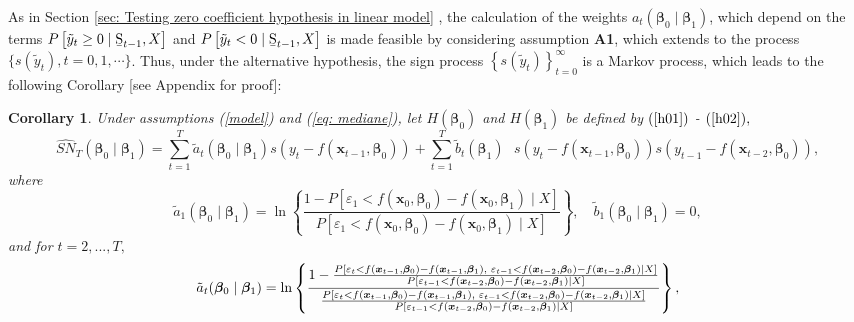 \documentclass[harvard,11pt]{article}
\newtheorem{corollary}{Corollary}
\begin{document}
As in Section \ref{sec: Testing zero coefficient hypothesis in linear model}%
, the calculation of the weights $a_{t}(\bm{\beta}_{0}\mid\bm{\beta}_{1})$, which depend on the terms $P\left[ \tilde{y}_{t}\geq 0\mid \text{\b{S%
}}_{t-1},X\right] $ and $P\left[ \tilde{y}_{t}<0\mid \text{\b{S}}%
_{t-1},X\right] $ is made feasible by considering assumption \textbf{A1}, which extends to the process $\{s(\tilde{y}_t),t=0,1,\cdots\}$. Thus, under the alternative hypothesis, the sign process $\left\{
s(\tilde{y}_{t})\right\} _{t=0}^{\infty }$ is a Markov process, which leads to the following Corollary [see Appendix for proof]:
\begin{corollary}
\label{Corollary2} Under assumptions (\ref{model}) and  (\ref{eq: mediane}),
let $H(\bm{\beta}_{0})$ and $H(\bm{\beta}_{1})$ be defined by $(\ref{h01})$ - $(\ref%
{h02}),$%
\begin{equation*}
\widehat{SN}_{T}(\bm{\beta}_{0}\mid\bm{\beta}_{1})=\sum\limits_{t=1}^{T}\tilde{a}%
_{t}(\bm{\beta}_{0}\mid\bm{\beta}_{1})s(y_{t}-f(\bm{x}_{t-1},\bm{\beta}_{0}))+\sum\limits_{t=1}^{T}\tilde{b}_{t}(\bm{\beta}_{1})\text{ }%
s(y_{t}-f(\bm{x}_{t-1},\bm{\beta}_{0}))s(y_{t-1}-f(\bm{x}_{t-2},\bm{\beta}_{0})),
\end{equation*}%
where%
\begin{equation*}
\tilde{a}_{1}(\bm{\beta}_{0}\mid\bm{\beta}_{1})=\ln \left\{ \frac{1-P\left[
\varepsilon_{1}<f(\bm{x}_{0},\bm{\beta}_{0})-f(\bm{x}_{0},\bm{\beta}_{1})\mid X\right] }{P\left[
\varepsilon_{1}<f(\bm{x}_{0},\bm{\beta} _{0})-f(\bm{x}_{0},\bm{\beta}_{1})\mid X\right] }\right\} ,\quad%
\tilde{b}_{1}(\bm{\beta}_{0}\mid\bm{\beta}_{1})=0,
\end{equation*}%
and for $t=2,...,T,$%
\begin{equation*}
\tilde{a}_{t}(\bm{\beta}_{0}\mid\bm{\beta}_{1})=\ln \left\{ \frac{1-\frac{P%
\left[ \varepsilon_{t}<f(\bm{x}_{t-1},\bm{\beta}_{0})-f(\bm{x}_{t-1},\bm{\beta}_{1}),\text{ }%
\varepsilon_{t-1}<f(\bm{x}_{t-2},\bm{\beta}_{0})-f(\bm{x}_{t-2},\bm{\beta}_{1})\mid X\right] }{P%
\left[ \varepsilon_{t-1}<f(\bm{x}_{t-2},\bm{\beta}_{0})-f(\bm{x}_{t-2},\bm{\beta}_{1})\mid X\right] }}{\frac{%
P\left[ \varepsilon_{t}<f(\bm{x}_{t-1},\bm{\beta}_{0})-f(\bm{x}_{t-1},\bm{\beta}_{1}),\text{ }%
\varepsilon_{t-1}<f(\bm{x}_{t-2},\bm{\beta}_{0})-f(\bm{x}_{t-2},\bm{\beta}_{1})\mid X\right] }{P%
\left[ \varepsilon_{t-1}<f(\bm{x}_{t-2},\bm{\beta}_{0})-f(\bm{x}_{t-2},\bm{\beta}_{1})\mid X\right] }}\right\},
\end{equation*}
\begin{equation*}

\end{equation*}
\end{corollary}
\end{document}

